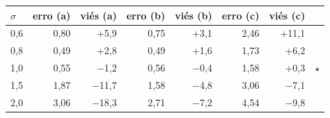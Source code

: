 \begin{tabular}{lrrrrrrc}
\toprule
\textbf{$\sigma$} & \textbf{erro (a)} & \textbf{viés (a)} & \textbf{erro (b)} & \textbf{viés (b)} & \textbf{erro (c)} & \textbf{viés (c)} & \textbf{} \\
\midrule
0{,}6 & 0{,}80 & +5{,}9 & 0{,}75 & +3{,}1 & 2{,}46 & +11{,}1 &  \\
0{,}8 & 0{,}49 & +2{,}8 & 0{,}49 & +1{,}6 & 1{,}73 & +6{,}2 &  \\
1{,}0 & 0{,}55 & $-$1{,}2 & 0{,}56 & $-$0{,}4 & 1{,}58 & +0{,}3 & $\star$ \\
1{,}5 & 1{,}87 & $-$11{,}7 & 1{,}58 & $-$4{,}8 & 3{,}06 & $-$7{,}1 &  \\
2{,}0 & 3{,}06 & $-$18{,}3 & 2{,}71 & $-$7{,}2 & 4{,}54 & $-$9{,}8 &  \\
\bottomrule
\end{tabular}

